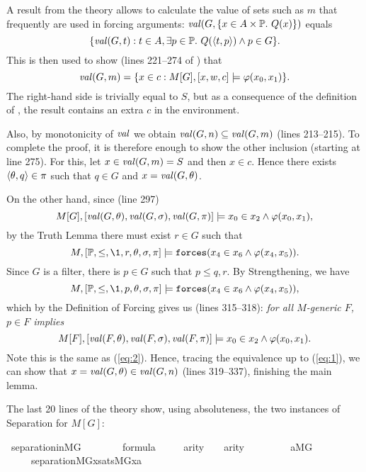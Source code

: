 A result from the theory  allows to calculate the value
of sets such as $m$ that frequently are used in forcing arguments: 
$\operatorname{\mathit{val}}(G,\{x\in A\times \mathbb{P}.\ Q(x)\})$ equals
\[
\{\operatorname{\mathit{val}}(G,t) : t\in A , \exists
  p\in \mathbb{P} .\ Q(\langle t,p\rangle) \wedge p \in G\}.
\]
This is then used to show  (lines 221--274 of ) that 
\[
  \operatorname{\mathit{val}}(G,m) = \{x\in c : M[G],[x,w,c]\models \varphi(x_0,x_1)\}.
\]
The right-hand side is trivially equal to $S$, but as a consequence of
the definition of 
, the result contains an extra $c$ in the
environment.

Also, by monotonicity of $\operatorname{\mathit{val}}$ we obtain 
  $\operatorname{\mathit{val}}(G,n)\subseteq \operatorname{\mathit{val}}(G,m)$ (lines 213--215).
To complete the proof, it is therefore enough to show the other
inclusion (starting at line 275).
For this, let $x\in \operatorname{\mathit{val}}(G,m) = S$ and then $x\in c$. Hence there exists
$\langle\theta,q\rangle\in\pi$ such that $q\in G$ and $x=\operatorname{\mathit{val}}(G,\theta)$. 

On the other hand, since (line 297)
\[
M[G],[\operatorname{\mathit{val}}(G,\theta),\operatorname{\mathit{val}}(G,\sigma),\operatorname{\mathit{val}}(G,\pi)]\models
 x_0\in x_2\wedge\varphi( x_0, x_1),
\]
by the  Truth Lemma there must exist $r\in G$ such that
\[
M,[\PP,\leq,\1,r,\th,\sig,\pi]\models
\forceisa(x_4\in x_6\y\phi( x_4, x_5)).
\]
Since $G$ is a filter, there is $p\in G$ such that $p\leq q, r$.
By Strengthening, we have
\[
M,[\PP,\leq,\1,p,\th,\sig,\pi]\models
\forceisa(x_4\in x_6\y \phi( x_4, x_5)),
\]
which by the Definition of Forcing gives us (lines 315--318): \emph{for all $M$-generic $F$,
  $p\in F$ implies} 
\[
M[F],[\operatorname{\mathit{val}}(F,\theta),\operatorname{\mathit{val}}(F,\sigma),\operatorname{\mathit{val}}(F,\pi)]\models
 x_0\in  x_2 \wedge\varphi( x_0, x_1).
\]
Note this is the same as (\ref{eq:2}). Hence, tracing the equivalence
up to (\ref{eq:1}), we can show that $x=\operatorname{\mathit{val}}(G,\theta)\in \operatorname{\mathit{val}}(G,n)$
(lines 319--337), finishing the main lemma.

The last 20 lines of the theory show, using absoluteness, the two
instances of Separation for $M[G]$:

\begin{isabelle}
\isamarkupfalse%
\ separation{\isacharunderscore}in{\isacharunderscore}MG{\isacharcolon}\isanewline
\ \ \ \isanewline
\ \ \ \ {\isachardoublequoteopen}{\isasymphi}{\isasymin}formula{\isachardoublequoteclose}\ \isanewline
\ \ \ \  {\isachardoublequoteopen}arity{\isacharparenleft}{\isasymphi}{\isacharparenright}\ {\isacharequal}\ {}\ {\isasymor}\ arity{\isacharparenleft}{\isasymphi}{\isacharparenright}{\isacharequal}{}{\isachardoublequoteclose}\isanewline
\ \ \ \ \isanewline
\ \ \ \ {\isachardoublequoteopen}{\isasymforall}a{\isasymin}{\isacharparenleft}M{\isacharbrackleft}G{\isacharbrackright}{\isacharparenright}{\isachardot}\isanewline 
 \ \ \ \ \  separation{\isacharparenleft}{\isacharhash}{\isacharhash}M{\isacharbrackleft}G{\isacharbrackright}{\isacharcomma}{\isasymlambda}x{\isachardot}sats{\isacharparenleft}M{\isacharbrackleft}G{\isacharbrackright}{\isacharcomma}{\isasymphi}{\isacharcomma}{\isacharbrackleft}x{\isacharcomma}a{\isacharbrackright}{\isacharparenright}{\isacharparenright}{\isachardoublequoteclose}
\end{isabelle}
   
